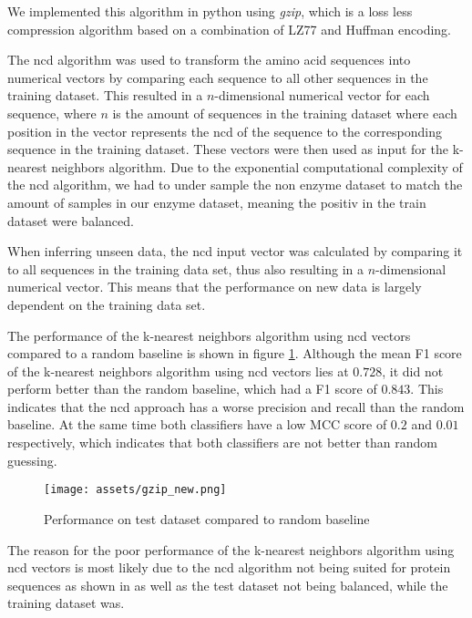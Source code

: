\documentclass{bioinfo}
\begin{document}
We implemented this algorithm in python using \textit{gzip}, which is a loss less compression algorithm based on a combination of LZ77 and Huffman encoding. \cite{Rigler2007} 

The ncd algorithm was used to transform the amino acid sequences into numerical vectors by comparing each sequence to all other sequences in the training dataset.
This resulted in a $n$-dimensional numerical vector for each sequence, where $n$ is the amount of sequences in the training dataset where each
position in the vector represents the ncd of the sequence to the corresponding sequence in the training dataset.
These vectors were then used as input for the k-nearest neighbors algorithm.
Due to the exponential computational complexity of the ncd algorithm, we had to under sample the non enzyme dataset to match the amount of samples in our enzyme dataset, meaning
the positiv in the train dataset were balanced. 

When inferring unseen data, the ncd input vector was calculated by comparing it to all sequences in the training data set, thus also resulting in a $n$-dimensional numerical vector.
This means that the performance on new data is largely dependent on the training data set.

The performance of the k-nearest neighbors algorithm using ncd vectors compared to a random baseline is shown in figure \ref{fig:03}.
Although the mean F1 score of the k-nearest neighbors algorithm using ncd vectors lies at $0.728$, it did not perform better than the random baseline, which had a F1 score of $0.843$.
This indicates that the ncd approach has a worse precision and recall than the random baseline.
At the same time both classifiers have a low MCC 
score of $0.2$ and $0.01$ respectively, which indicates that both classifiers are not better than random guessing.

\begin{figure}[!thbp]
\texttt{[image: assets/gzip\_new.png]}
\caption{Performance on test dataset compared to random baseline}\label{fig:03}
\end{figure}

The reason for the poor performance of the k-nearest neighbors algorithm using ncd vectors is
most likely due to the ncd algorithm not being suited for protein sequences as shown in \cite{GzipProteinCompression} as well as
the test dataset not being balanced, while the training dataset was.




 

\end{document}
